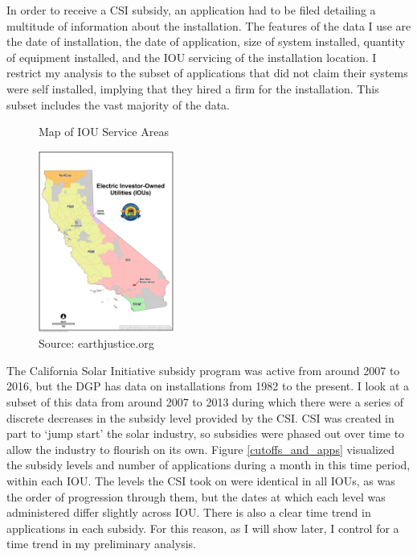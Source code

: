 \documentclass{article}
\begin{document}
In order to receive a CSI subsidy, an application had to be filed detailing a multitude of information about the installation. The features of the data I use are the date of installation, the date of application, size of system installed, quantity of equipment installed, and the IOU servicing of the installation location. I restrict my analysis to the subset of applications that did not claim their systems were self installed, implying that they hired a firm for the installation. This subset includes the vast majority of the data.

\begin{figure}
\begin{center}
Map of IOU Service Areas


\includegraphics[width=0.4\textwidth]{CA_IOUS}
\end{center}
\caption{Source: earthjustice.org}
\label{iou_map}
\end{figure}

The California Solar Initiative subsidy program was active from around 2007 to 2016, but the DGP has data on installations from 1982 to the present. I look at a subset of this data from around 2007 to 2013 during which there were a series of discrete decreases in the subsidy level provided by the CSI. CSI was created in part to `jump start' the solar industry, so subsidies were phased out over time to allow the industry to flourish on its own. Figure \ref{cutoffs_and_apps} visualized the subsidy levels and number of applications during a month in this time period, within each IOU. The levels the CSI took on were identical in all IOUs, as was the order of progression through them, but the dates at which each level was administered differ slightly across IOU. There is also a clear time trend in applications in each subsidy. For this reason, as I will show later, I control for a time trend in my preliminary analysis.
\end{document}
